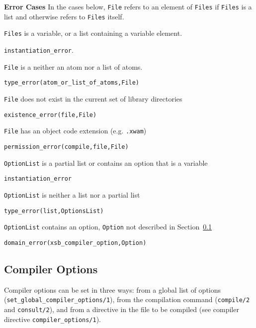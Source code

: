 \begin{description}
{\bf Error Cases}
In the cases below, {\tt File} refers to an element of {\tt Files} if
{\tt Files} is a list and otherwise refers to {\tt Files} itself.
\bi
\item 	{\tt Files} is a variable, or a list containing a variable element.
\bi
\item 	{\tt instantiation\_error}.
\ei
\item  {\tt File} is a neither an atom nor a list of atoms.
\bi
\item 	{\tt type\_error(atom\_or\_list\_of\_atoms,File)}
\ei
\item  {\tt File} does not exist in the current set of
  library directories 
\bi
\item 	{\tt existence\_error(file,File)}
\ei
%
\item 	{\tt File} has an object code extension (e.g. {\tt .xwam})
\bi
\item 	{\tt permission\_error(compile,file,File)}
\ei
%
\item 	{\tt OptionList} is a partial list or contains an option that is a variable
\bi
\item 	{\tt instantiation\_error}
\ei
\item 	{\tt OptionList} is neither a list nor a partial list
\bi
\item 	{\tt type\_error(list,OptionsList)}
\ei
\item {\tt OptionList} contains an option, {\tt Option} not described
  in Section~\ref{sec:CompilerOptions} 
\bi
\item 	{\tt domain\_error(xsb\_compiler\_option,Option)}
\ei
\ei

\end{description}

\subsection{Compiler Options}\label{sec:CompilerOptions}

Compiler options can be set in three ways: from a global list of
options ({\tt set\_global\_compiler\_options/1}), from the
compilation command ({\tt compile/2} and {\tt consult/2}), and
from a directive in the file to be compiled (see compiler directive
{\tt compiler\_options/1}).

